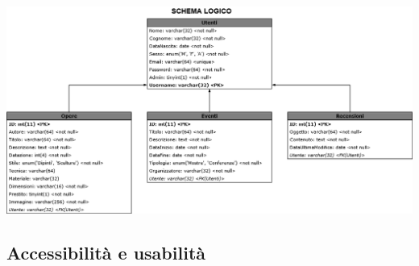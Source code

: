 \begin{center}
	\includegraphics[width=\textwidth]{img/SchemaLogico}
\end{center}


\subsection{Accessibilità e usabilità}
\label{progettazione-accessibilità-usabilità}


